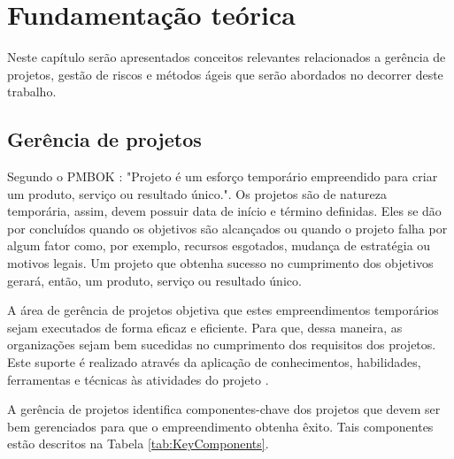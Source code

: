 \documentclass[
    12pt,       %
    openright,      %
    twoside,      %
    a4paper,      %
    english,      %
    french,       %
    spanish,      %
    brazil,       %
    ]{abntex2}
\begin{document}
\chapter{Fundamentação teórica}
\label{sec:Fundamentacao}

Neste capítulo serão apresentados conceitos relevantes relacionados a gerência de projetos, gestão de riscos e métodos ágeis que serão abordados no decorrer deste trabalho.

\section{Gerência de projetos}

Segundo o PMBOK \cite{PMBOK:2017}: "Projeto é um esforço temporário empreendido para criar um produto, serviço ou resultado único.". Os projetos são de natureza temporária, assim, devem possuir data de início e término definidas. Eles se dão por concluídos quando os objetivos são alcançados ou quando o projeto falha por algum fator como, por exemplo, recursos esgotados, mudança de estratégia ou motivos legais. Um projeto que obtenha sucesso no cumprimento dos objetivos gerará, então, um produto, serviço ou resultado único. 

A área de gerência de projetos objetiva que estes empreendimentos temporários sejam executados de forma eficaz e eficiente. Para que, dessa maneira, as organizações sejam bem sucedidas no cumprimento dos requisitos dos projetos. Este suporte é realizado através da aplicação de conhecimentos, habilidades, ferramentas e técnicas às atividades do projeto \cite{PMBOK:2017}. 

A gerência de projetos identifica componentes-chave dos projetos que devem ser bem gerenciados para que o empreendimento obtenha êxito. Tais componentes estão descritos na Tabela \ref{tab:KeyComponents}.
\end{document}
